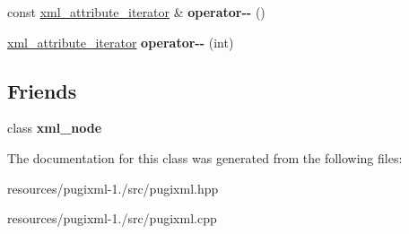 \begin{DoxyCompactItemize}
\item 
\hypertarget{classpugi_1_1xml__attribute__iterator_a7ac06eb61d47a9e57bcd0fd2434c6243}{const \hyperlink{classpugi_1_1xml__attribute__iterator}{xml\+\_\+attribute\+\_\+iterator} \& {\bfseries operator-\/-\/} ()}\label{classpugi_1_1xml__attribute__iterator_a7ac06eb61d47a9e57bcd0fd2434c6243}

\item 
\hypertarget{classpugi_1_1xml__attribute__iterator_a48737f6e77abe7fa3e80841597dc93e1}{\hyperlink{classpugi_1_1xml__attribute__iterator}{xml\+\_\+attribute\+\_\+iterator} {\bfseries operator-\/-\/} (int)}\label{classpugi_1_1xml__attribute__iterator_a48737f6e77abe7fa3e80841597dc93e1}

\end{DoxyCompactItemize}
\subsection*{Friends}
\begin{DoxyCompactItemize}
\item 
\hypertarget{classpugi_1_1xml__attribute__iterator_a156d917a92815c7b593bd5ef19f6d5fb}{class {\bfseries xml\+\_\+node}}\label{classpugi_1_1xml__attribute__iterator_a156d917a92815c7b593bd5ef19f6d5fb}

\end{DoxyCompactItemize}


The documentation for this class was generated from the following files\+:\begin{DoxyCompactItemize}
\item 
resources/pugixml-\/1./src/pugixml.\+hpp\item 
resources/pugixml-\/1./src/pugixml.\+cpp\end{DoxyCompactItemize}
